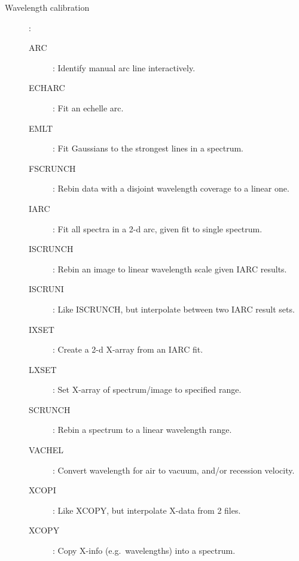 \begin {description}
\begin{description}
\item [Wavelength calibration]\hspace{-1.5mm}:
\begin{description}
\item [ARC]: Identify manual arc line interactively.
\item [ECHARC]: Fit an echelle arc.
\item [EMLT]: Fit Gaussians to the strongest lines in a spectrum.
\item [FSCRUNCH]: Rebin data with a disjoint wavelength coverage to a linear one.
\item [IARC]: Fit all spectra in a 2-d arc, given fit to single spectrum.
\item [ISCRUNCH]: Rebin an image to linear wavelength scale given IARC results.
\item [ISCRUNI]: Like ISCRUNCH, but interpolate between two IARC result sets.
\item [IXSET]: Create a 2-d X-array from an IARC fit.
\item [LXSET]: Set X-array of spectrum/image to specified range.
\item [SCRUNCH]: Rebin a spectrum to a linear wavelength range.
\item [VACHEL]: Convert wavelength for air to vacuum, and/or recession velocity.
\item [XCOPI]: Like XCOPY, but interpolate X-data from 2 files.
\item [XCOPY]: Copy X-info (e.g.\ wavelengths) into a spectrum.
\end{description}


\end{description}
\end{description}
